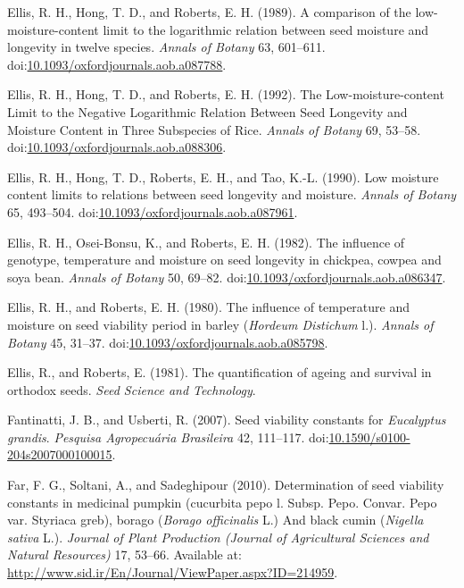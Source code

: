\documentclass[]{article}
\begin{document}
\leavevmode\hypertarget{ref-ellis_comparison_1989}{}%
Ellis, R. H., Hong, T. D., and Roberts, E. H. (1989). A comparison of
the low-moisture-content limit to the logarithmic relation between seed
moisture and longevity in twelve species. \emph{Annals of Botany} 63,
601--611.
doi:\href{https://doi.org/10.1093/oxfordjournals.aob.a087788}{10.1093/oxfordjournals.aob.a087788}.

\leavevmode\hypertarget{ref-ellis_low-moisture-content_1992}{}%
Ellis, R. H., Hong, T. D., and Roberts, E. H. (1992). The
Low-moisture-content Limit to the Negative Logarithmic Relation Between
Seed Longevity and Moisture Content in Three Subspecies of Rice.
\emph{Annals of Botany} 69, 53--58.
doi:\href{https://doi.org/10.1093/oxfordjournals.aob.a088306}{10.1093/oxfordjournals.aob.a088306}.

\leavevmode\hypertarget{ref-ellis_low_1990}{}%
Ellis, R. H., Hong, T. D., Roberts, E. H., and Tao, K.-L. (1990). Low
moisture content limits to relations between seed longevity and
moisture. \emph{Annals of Botany} 65, 493--504.
doi:\href{https://doi.org/10.1093/oxfordjournals.aob.a087961}{10.1093/oxfordjournals.aob.a087961}.

\leavevmode\hypertarget{ref-ellis_influence_1982}{}%
Ellis, R. H., Osei-Bonsu, K., and Roberts, E. H. (1982). The influence
of genotype, temperature and moisture on seed longevity in chickpea,
cowpea and soya bean. \emph{Annals of Botany} 50, 69--82.
doi:\href{https://doi.org/10.1093/oxfordjournals.aob.a086347}{10.1093/oxfordjournals.aob.a086347}.

\leavevmode\hypertarget{ref-ellis_influence_1980}{}%
Ellis, R. H., and Roberts, E. H. (1980). The influence of temperature
and moisture on seed viability period in barley (\emph{Hordeum
Distichum} l.). \emph{Annals of Botany} 45, 31--37.
doi:\href{https://doi.org/10.1093/oxfordjournals.aob.a085798}{10.1093/oxfordjournals.aob.a085798}.

\leavevmode\hypertarget{ref-ellis_quantification_1981}{}%
Ellis, R., and Roberts, E. (1981). The quantification of ageing and
survival in orthodox seeds. \emph{Seed Science and Technology}.

\leavevmode\hypertarget{ref-fantinatti_seed_2007}{}%
Fantinatti, J. B., and Usberti, R. (2007). Seed viability constants for
\emph{Eucalyptus grandis}. \emph{Pesquisa Agropecuária Brasileira} 42,
111--117.
doi:\href{https://doi.org/10.1590/s0100-204s2007000100015}{10.1590/s0100-204s2007000100015}.

\leavevmode\hypertarget{ref-far_determination_2010}{}%
Far, F. G., Soltani, A., and Sadeghipour (2010). Determination of seed
viability constants in medicinal pumpkin (cucurbita pepo l. Subsp. Pepo.
Convar. Pepo var. Styriaca greb), borago (\emph{Borago officinalis} L.)
And black cumin (\emph{Nigella sativa} L.). \emph{Journal of Plant
Production (Journal of Agricultural Sciences and Natural Resources)} 17,
53--66. Available at:
\url{http://www.sid.ir/En/Journal/ViewPaper.aspx?ID=214959}.
\end{document}
